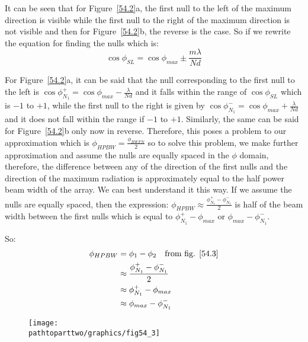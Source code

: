 It can be seen that for Figure~\ref{54.2}a, the first null to the left of the maximum direction  is visible while the first null to the right of the maximum direction is not visible and then for Figure~\ref{54.2}b, the reverse is the case. So if we rewrite the equation for finding the nulls which is:
\begin{equation}
\cos{\phi_{SL}} = \cos{\phi_{max}} \pm \frac{m \lambda}{N d} 
\end{equation}

For Figure~\ref{54.2}a, it can be said that the null corresponding to the first null to the left is $\cos{\phi^+_{N_1}} = \cos{\phi_{max}} - \frac{ \lambda}{N d} $ and it falls within the range of $\cos{\phi_{SL}}$ which is $-1$ to $+1$, while the first null to the right is given by $\cos{\phi^-_{N_1}} = \cos{\phi_{max}} + \frac{ \lambda}{N d} $ and it does not fall within the range if $-1$ to $+1$. Similarly, the same can be said for Figure~\ref{54.2}b only now in reverse. Therefore, this poses a problem to our approximation which is $\phi_{HPBW} = \frac{ \phi_{BWFN}}{2}$ so to solve this problem, we make further approximation and assume the nulls are equally spaced in the $\phi$  domain, therefore, the difference between any of the direction of the first nulls and the direction of the maximum radiation is approximately equal to the half power beam width of the array. We can best understand it this way. If we assume the nulls are equally spaced, then the expression:
$
\phi_{HPBW} \approx \frac{\phi^+_{N_1} - \phi^-_{N_1}}{2}
$
is half of the beam width between the first nulls which is equal to $\phi^+_{N_1} - \phi_{max}$ or  $\phi_{max} - \phi^-_{N_1}$.

So:
\begin{equation}
\begin{split}
\phi_{HPBW} &= \phi_{1}  - \phi_{2}\quad \text{from fig. \ref{54.3}}\\
&\approx \frac{\phi^+_{N_1} - \phi^-_{N_1}}{2} \\
& \approx \phi^+_{N_1} - \phi_{max} \\
& \approx \phi_{max} - \phi^-_{N_1}
\end{split}
\end{equation}

\begin{figure}[h]
\centering
\texttt{[image: \\pathtoparttwo/graphics/fig54\_3]}
\caption{}
\label{54.3}
\end{figure}

